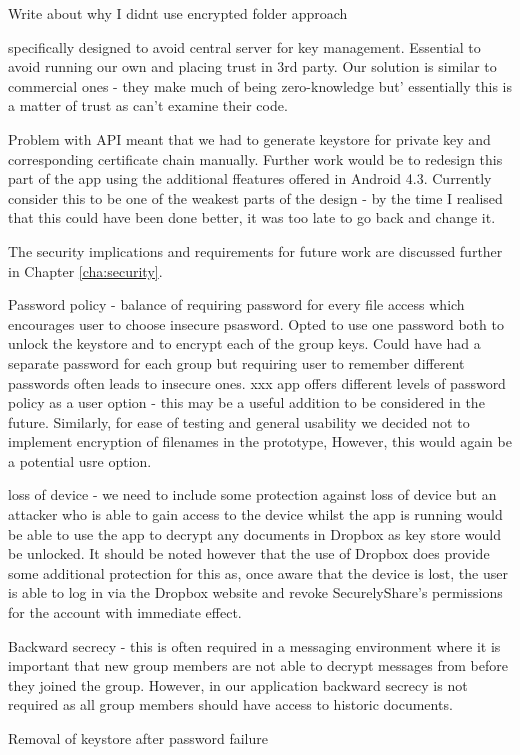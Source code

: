  Write about why I didnt use encrypted folder approach
 
 
specifically designed to avoid central server for key management.  Essential to avoid running our own and placing trust in 3rd party.  Our solution is similar to commercial ones - they make much of being zero-knowledge but' essentially this is a matter of trust as can't examine their code.
 
 Problem with API meant that we had to generate keystore for private key and corresponding certificate chain manually.  Further work would be to redesign this part of the app using the additional ffeatures offered in Android 4.3.  Currently consider this to be one of the weakest parts of the design - by the time I realised that this could have been done better, it was too late to go back and change it.
 
 The security implications and requirements for future work are discussed further in Chapter \ref{cha:security}.
 
Password policy - balance of requiring password for every file access which encourages user to choose insecure psasword.  Opted to use one password both to unlock the keystore and to encrypt each of the group keys.  Could have had a separate password for each group but requiring user to remember different passwords often leads to insecure ones.  xxx app offers different levels of password policy as a user option - this may be a useful addition to be considered in the future.   Similarly, for ease of testing and general usability we decided not to implement encryption of filenames in the prototype,  However, this would again be a potential usre option.
 
 loss of device - we need to include some protection against loss of device but an attacker who is able to gain access to the device whilst the app is running would be able to use the app to decrypt any documents in Dropbox as key store would be unlocked.  It should be noted however that the use of Dropbox does provide some additional protection for this as, once aware that the device is lost, the user is able to log in via the Dropbox website and revoke SecurelyShare's permissions for the account with immediate effect. 
 
Backward secrecy  - this is often required in a messaging environment where it is important that new group members are not able to decrypt messages from before they joined the group. However, in our application backward secrecy is not required as all group members should have access to historic documents.


Removal of keystore after password failure
 
\\
